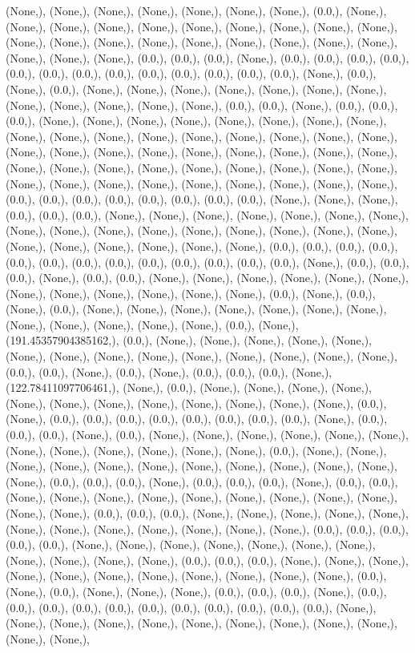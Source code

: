 \documentclass{article}
\begin{document}
(None,), (None,), (None,), (None,), (None,), (None,), (None,), (0.0,), (None,), (None,), (None,), (None,), (None,), (None,), (None,), (None,), (None,), (None,), (None,), (None,), (None,), (None,), (None,), (None,), (None,), (None,), (None,), (None,), (None,), (None,), (0.0,), (0.0,), (0.0,), (None,), (0.0,), (0.0,), (0.0,), (0.0,), (0.0,), (0.0,), (0.0,), (0.0,), (0.0,), (0.0,), (0.0,), (0.0,), (0.0,), (None,), (0.0,), (None,), (0.0,), (None,), (None,), (None,), (None,), (None,), (None,), (None,), (None,), (None,), (None,), (None,), (None,), (0.0,), (0.0,), (None,), (0.0,), (0.0,), (0.0,), (None,), (None,), (None,), (None,), (None,), (None,), (None,), (None,), (None,), (None,), (None,), (None,), (None,), (None,), (None,), (None,), (None,), (None,), (None,), (None,), (None,), (None,), (None,), (None,), (None,), (None,), (None,), (None,), (None,), (None,), (None,), (None,), (None,), (None,), (None,), (None,), (None,), (None,), (None,), (None,), (None,), (None,), (None,), (None,), (0.0,), (0.0,), (0.0,), (0.0,), (0.0,), (0.0,), (0.0,), (0.0,), (None,), (None,), (None,), (0.0,), (0.0,), (0.0,), (None,), (None,), (None,), (None,), (None,), (None,), (None,), (None,), (None,), (None,), (None,), (None,), (None,), (None,), (None,), (None,), (None,), (None,), (None,), (None,), (None,), (None,), (0.0,), (0.0,), (0.0,), (0.0,), (0.0,), (0.0,), (0.0,), (0.0,), (0.0,), (0.0,), (0.0,), (0.0,), (0.0,), (None,), (0.0,), (0.0,), (0.0,), (None,), (0.0,), (0.0,), (None,), (None,), (None,), (None,), (None,), (None,), (None,), (None,), (None,), (None,), (None,), (None,), (0.0,), (None,), (0.0,), (None,), (0.0,), (None,), (None,), (None,), (None,), (None,), (None,), (None,), (None,), (None,), (None,), (None,), (None,), (0.0,), (None,), (191.45357904385162,), (0.0,), (None,), (None,), (None,), (None,), (None,), (None,), (None,), (None,), (None,), (None,), (None,), (None,), (None,), (None,), (0.0,), (0.0,), (None,), (0.0,), (None,), (0.0,), (0.0,), (0.0,), (None,), (122.78411097706461,), (None,), (0.0,), (None,), (None,), (None,), (None,), (None,), (None,), (None,), (None,), (None,), (None,), (None,), (None,), (0.0,), (None,), (0.0,), (0.0,), (0.0,), (0.0,), (0.0,), (0.0,), (0.0,), (0.0,), (None,), (0.0,), (0.0,), (0.0,), (None,), (0.0,), (None,), (None,), (None,), (None,), (None,), (None,), (None,), (None,), (None,), (None,), (None,), (None,), (0.0,), (None,), (None,), (None,), (None,), (None,), (None,), (None,), (None,), (None,), (None,), (None,), (None,), (0.0,), (0.0,), (0.0,), (None,), (0.0,), (0.0,), (0.0,), (None,), (0.0,), (0.0,), (None,), (None,), (None,), (None,), (None,), (None,), (None,), (None,), (None,), (None,), (None,), (0.0,), (0.0,), (0.0,), (None,), (None,), (None,), (None,), (None,), (None,), (None,), (None,), (None,), (None,), (None,), (None,), (0.0,), (0.0,), (0.0,), (0.0,), (0.0,), (None,), (None,), (None,), (None,), (None,), (None,), (None,), (None,), (None,), (None,), (None,), (0.0,), (0.0,), (0.0,), (None,), (None,), (None,), (None,), (None,), (None,), (None,), (None,), (None,), (None,), (None,), (0.0,), (None,), (0.0,), (None,), (None,), (None,), (0.0,), (0.0,), (0.0,), (None,), (0.0,), (0.0,), (0.0,), (0.0,), (0.0,), (0.0,), (0.0,), (0.0,), (0.0,), (0.0,), (0.0,), (None,), (None,), (None,), (None,), (None,), (None,), (None,), (None,), (None,), (None,), (None,), (None,), 
\end{document}

